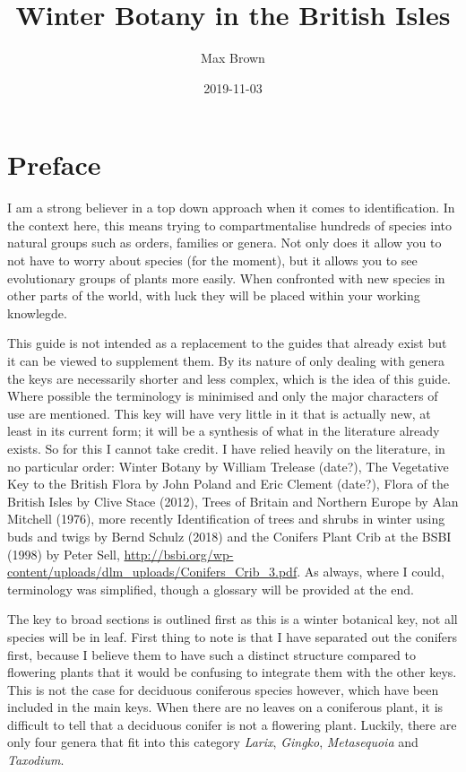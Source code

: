 \documentclass[openany]{book}
\title{Winter Botany in the British Isles}
\author{Max Brown}
\date{2019-11-03}
\begin{document}
\maketitle

{
\setcounter{tocdepth}{1}
\tableofcontents
}
\hypertarget{preface}{%
\chapter*{Preface}\label{preface}}

I am a strong believer in a top down approach when it comes to identification. In the context here, this means trying to compartmentalise hundreds of species into natural groups such as orders, families or genera. Not only does it allow you to not have to worry about species (for the moment), but it allows you to see evolutionary groups of plants more easily. When confronted with new species in other parts of the world, with luck they will be placed within your working knowlegde.

This guide is not intended as a replacement to the guides that already exist but it can be viewed to supplement them. By its nature of only dealing with genera the keys are necessarily shorter and less complex, which is the idea of this guide. Where possible the terminology is minimised and only the major characters of use are mentioned. This key will have very little in it that is actually new, at least in its current form; it will be a synthesis of what in the literature already exists. So for this I cannot take credit. I have relied heavily on the literature, in no particular order: Winter Botany by William Trelease (date?), The Vegetative Key to the British Flora by John Poland and Eric Clement (date?), Flora of the British Isles by Clive Stace (2012), Trees of Britain and Northern Europe by Alan Mitchell (1976), more recently Identification of trees and shrubs in winter using buds and twigs by Bernd Schulz (2018) and the Conifers Plant Crib at the BSBI (1998) by Peter Sell, \url{http://bsbi.org/wp-content/uploads/dlm_uploads/Conifers_Crib_3.pdf}. As always, where I could, terminology was simplified, though a glossary will be provided at the end.

The key to broad sections is outlined first as this is a winter botanical key, not all species will be in leaf. First thing to note is that I have separated out the conifers first, because I believe them to have such a distinct structure compared to flowering plants that it would be confusing to integrate them with the other keys. This is not the case for deciduous coniferous species however, which have been included in the main keys. When there are no leaves on a coniferous plant, it is difficult to tell that a deciduous conifer is not a flowering plant. Luckily, there are only four genera that fit into this category \emph{Larix}, \emph{Gingko}, \emph{Metasequoia} and \emph{Taxodium}.
\end{document}
